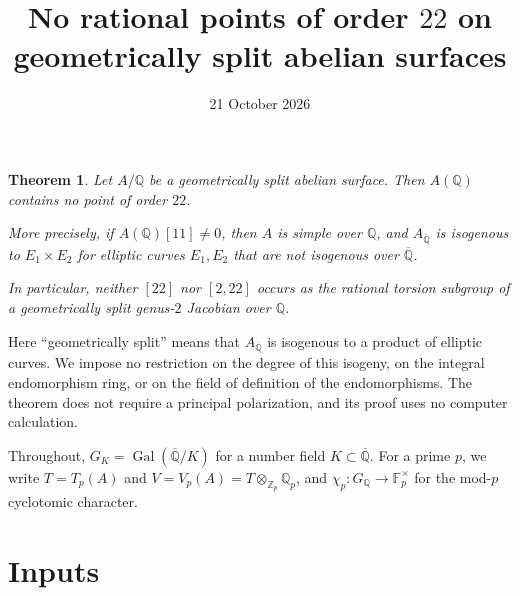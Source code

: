 \documentclass[11pt]{article}
\title{No rational points of order \(22\) on geometrically split abelian surfaces}
\author{}
\date{21 October 2026}
\newtheorem{theorem}{Theorem}
\theoremstyle{remark}
\newcommand{\Q}{\mathbb Q}
\newcommand{\Z}{\mathbb Z}
\newcommand{\F}{\mathbb F}
\DeclareMathOperator{\Gal}{Gal}
\begin{document}
\maketitle

\begin{theorem}\label{thm:main}
Let \(A/\Q\) be a geometrically split abelian surface. Then \(A(\Q)\)
contains no point of order \(22\).

More precisely, if \(A(\Q)[11]\neq0\), then \(A\) is simple over
\(\Q\), and \(A_{\overline{\Q}}\) is isogenous to \(E_1\times E_2\)
for elliptic curves \(E_1,E_2\) that are not isogenous over
\(\overline{\Q}\).

In particular, neither \([22]\) nor \([2,22]\) occurs as the rational
torsion subgroup of a geometrically split genus-\(2\) Jacobian over
\(\Q\).
\end{theorem}

Here ``geometrically split'' means that \(A_{\overline{\Q}}\) is
isogenous to a product of elliptic curves. We impose no restriction on
the degree of this isogeny, on the integral endomorphism ring, or on
the field of definition of the endomorphisms. The theorem does not
require a principal polarization, and its proof uses no computer
calculation.

Throughout, \(G_K=\Gal(\overline{\Q}/K)\) for a number field
\(K\subset\overline{\Q}\). For a prime \(p\), we write
\(T=T_p(A)\) and \(V=V_p(A)=T\otimes_{\Z_p}\Q_p\), and
\(\chi_p:G_{\Q}\to\F_p^\times\) for the mod-\(p\) cyclotomic
character.

\section{Inputs}\label{sec:inputs}
\end{document}
